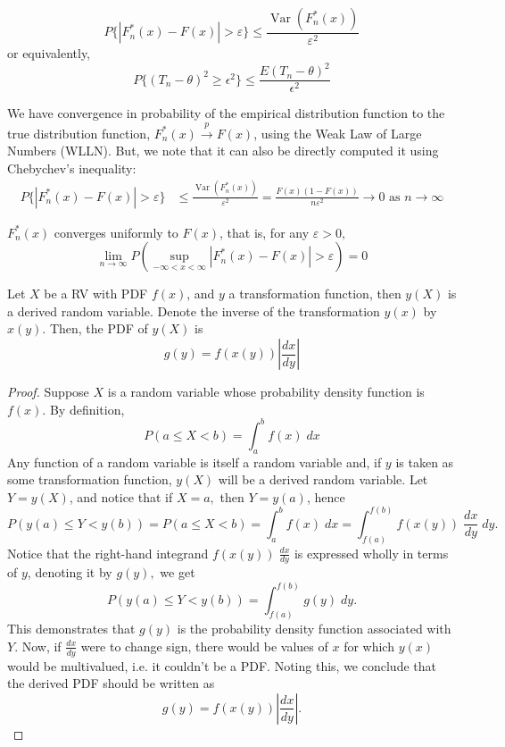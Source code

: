 \documentclass{tufte-handout}
\DeclareMathOperator{\var}{Var}
\begin{document}
\begin{proposition} \label{ineq:Chebychev}
  $$P\{|F^*_n(x) - F(x) |> \varepsilon \}\leq \frac{\var (F^*_n(x))}{\varepsilon^2}  $$
or equivalently, 
  $$P\{(T_n - \theta)^2\geq \epsilon^2\}\leq \frac{E(T_n - \theta)^2}{\epsilon^2}$$
\end{proposition}
We have convergence in probability of the empirical distribution function to
the true distribution function, $F^*_n(x) \overset{p}{\to} F(x) $, using the Weak Law of Large Numbers (WLLN). But, we note that it can also be directly computed
it using Chebychev's inequality: 
\begin{equation*}
  \begin{split}
    P\{|F^*_n(x) - F(x) |> \varepsilon \}&\leq \frac{\var (F^*_n(x))}{\varepsilon^2} = \frac{F(x)(1-F(x))}{n\varepsilon^2} \to 0 \text{ as }n\to \infty
  \end{split}
\end{equation*}
\begin{theorem}
  $F^*_n(x)$ converges uniformly to $F(x)$, that is, for any $\varepsilon >0, $
  $$ \lim_{n \to \infty} P \left( \sup_{-\infty <x< \infty} |F^*_n(x) - F(x)| > \varepsilon \right) = 0 $$  
   
\end{theorem}
\begin{theorem}  
  Let $X$ be a RV with PDF $f(x)$, and $y$ a transformation function, then $y(X)$ is a derived random variable. Denote the inverse of the transformation $y(x)$ by $x(y)$. Then, the PDF of $y(X)$ is  
  $$g(y) = f(x(y)) \left| \frac{dx}{dy}  \right|  $$
  \begin{proof} 
    
Suppose $X$ is a random variable whose probability density function is $f(x)$.
By definition, 
    $$P(a \leq X < b ) = \int_a^b f(x) \; dx $$
Any function of a random variable is itself a random variable and, if $y$ is taken as some
    transformation function, $y(X)$ will be a derived random variable. Let $Y = y(X)$, and notice that if $X = a, $ then $Y = y(a)$, hence 
    $$P(y(a) \leq Y < y(b)) = P(a \leq X < b  ) = \int_a^b f(x) \; dx = \int_{f(a)}^{f(b)} f(x(y)) \;\frac{dx}{dy} \; dy. $$
    Notice that the right-hand integrand $f(x(y)) \;\frac{dx}{dy}$ is expressed wholly in terms of $y$, denoting it by $g(y),$ we get 
    $$P(y(a) \leq Y < y(b)) =  \int_{f(a)}^{f(b)} g(y) \; dy.$$
    This demonstrates that $g(y)$ is the probability density function associated with $Y$. Now, if $\frac{d {x}}{d {y}} {}$ were to change sign, there would be values of $x$ for which $y(x)$ would be multivalued, i.e. it couldn't be a PDF. Noting this, we conclude that the derived PDF should be written as 
    $$g(y) = f(x(y)) \left| \frac{d {x}}{d {y}} {} \right| .$$

  \end{proof}

\end{theorem}
\end{document}
